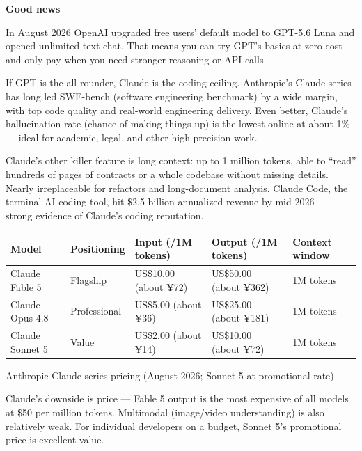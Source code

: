\textbf{Good news}\par

In August 2026 OpenAI upgraded free users' default model to GPT-5.6 Luna and opened unlimited text chat. That means you can try GPT's basics at zero cost and only pay when you need stronger reasoning or API calls.


If GPT is the all-rounder, Claude is the coding ceiling. Anthropic's Claude series has long led SWE-bench (software engineering benchmark) by a wide margin, with top code quality and real-world engineering delivery. Even better, Claude's hallucination rate (chance of making things up) is the lowest online at about 1\% — ideal for academic, legal, and other high-precision work.

Claude's other killer feature is long context: up to 1 million tokens, able to “read” hundreds of pages of contracts or a whole codebase without missing details. Nearly irreplaceable for refactors and long-document analysis. Claude Code, the terminal AI coding tool, hit \$2.5 billion annualized revenue by mid-2026 — strong evidence of Claude's coding reputation.

\begin{center}
\begin{tabularx}{\linewidth}{|X|X|X|X|X|}
\hline
\textbf{Model} & \textbf{Positioning} & \textbf{Input (/1M tokens)} & \textbf{Output (/1M tokens)} & \textbf{Context window} \tabularnewline
\hline
Claude Fable 5 & Flagship & US\$10.00 (about ¥72) & US\$50.00 (about ¥362) & 1M tokens \tabularnewline
Claude Opus 4.8 & Professional & US\$5.00 (about ¥36) & US\$25.00 (about ¥181) & 1M tokens \tabularnewline
Claude Sonnet 5 & Value & US\$2.00 (about ¥14) & US\$10.00 (about ¥72) & 1M tokens \tabularnewline
\hline
\end{tabularx}
\end{center}

\begin{center}\small\color{gray}Anthropic Claude series pricing (August 2026; Sonnet 5 at promotional rate)\end{center}

Claude's downside is price — Fable 5 output is the most expensive of all models at \$50 per million tokens. Multimodal (image/video understanding) is also relatively weak. For individual developers on a budget, Sonnet 5's promotional price is excellent value.


